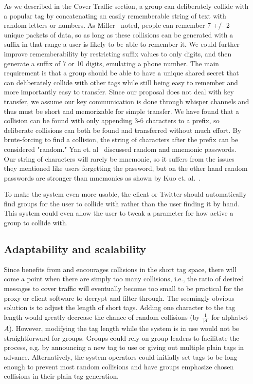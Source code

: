 As we described in the Cover Traffic section, a group can deliberately collide with a popular tag by concatenating an easily rememberable string of text with random letters or numbers. As Miller~\cite{miller56} noted, people can remember  
7 +/- 2 unique packets of data, so as long as these collisions can be generated with a suffix in that range a user is likely to be able to remember it. We could further improve rememberability by restricting suffix values to only digits, and then generate a suffix of 7 or 10 digits, emulating a phone number. The main requirement is that a group should be able to have a unique shared secret that can deliberately collide with other tags while still being easy to remember and more importantly easy to transfer. Since our proposal does not deal with key transfer, we assume our key communication is done through whisper channels and thus must be short and memorizable for simple transfer. We have found that a collision can be found with only appending 3-6 characters to a prefix, so deliberate collisions can both be found and transferred without much effort. By brute-forcing to find a collision, the string of characters after the prefix  can be considered "random." Yan et. al~\cite{yan00} discussed random and mnemonic passwords. Our string of characters will rarely be mnemonic, so it suffers from the issues they mentioned like users forgetting the password, but on the other hand random passwords are stronger than mnemonics as shown by Kuo et. al.~\cite{passwords06}.

To make the system even more usable, the client or Twitter should automatically find groups for the user to collide with rather than the user finding it by hand. This system could even allow the user to tweak a parameter for how active a group to collide with.
\fi



\subsection{Adaptability and scalability}

Since \hoot benefits from and encourages collisions in the short tag
space, there will come a point when there are simply too many
collisions, i.e., the ratio of desired messages to cover traffic will
eventually become too small to be practical for the proxy or client
software to decrypt and filter through. The seemingly obvious solution
is to adjust the length of short tags. Adding one character to the tag
length would greatly decrease the chance of random collisions (by
$\frac{1}{|A|}$ for alphabet $A$). However, modifying the tag length
while the system is in use would not be straightforward for
groups. Groups could rely on group leaders to facilitate the process,
e.g. by announcing a new tag to use or giving out multiple plain tags in
advance. Alternatively, the system operators could initially set tags to
be long enough to prevent most random collisions and have groups
emphasize chosen collisions in their plain tag generation.

